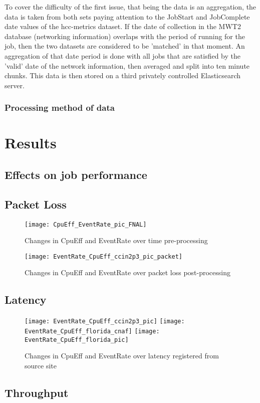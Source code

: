 \documentclass[]{scrartcl}
\begin{document}
To cover the difficulty of the first issue, that being the data is an aggregation, the data is taken from both sets paying attention to the JobStart and JobComplete date values of the hcc-metrics dataset. If the date of collection in the MWT2 database (networking information) overlaps with the period of running for the job, then the two datasets are considered to be 'matched' in that moment. An aggregation of that date period is done with all jobs that are satisfied by the 'valid' date of the network information, then averaged and split into ten minute chunks. This data is then stored on a third privately controlled Elasticsearch server.
\subsubsection{Processing method of data}
\section{Results}
\subsection{Effects on job performance}
\subsection{Packet Loss}
\begin{figure}
	\caption{Changes in CpuEff and EventRate over time pre-processing}
	\centering
	\texttt{[image: CpuEff\_EventRate\_pic\_FNAL]}
\end{figure}
\begin{figure}
	\caption{Changes in CpuEff and EventRate over packet loss post-processing}
	\centering
	\texttt{[image: EventRate\_CpuEff\_ccin2p3\_pic\_packet]}
\end{figure}
\subsection{Latency}
\begin{figure}
	\caption{Changes in CpuEff and EventRate over latency registered from source site}
	\centering
	\texttt{[image: EventRate\_CpuEff\_ccin2p3\_pic]}
	\texttt{[image: EventRate\_CpuEff\_florida\_cnaf]}
	\texttt{[image: EventRate\_CpuEff\_florida\_pic]}
\end{figure}
\subsection{Throughput}
\end{document}
